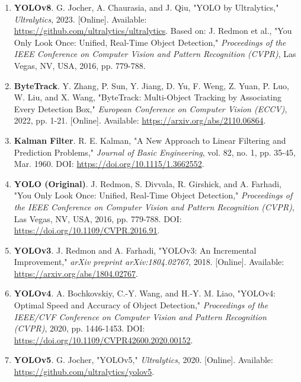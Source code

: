 \begin{enumerate}[resume]
    \item \textbf{YOLOv8}. G. Jocher, A. Chaurasia, and J. Qiu, "YOLO by Ultralytics," 
    \textit{Ultralytics}, 2023. [Online]. Available: \url{https://github.com/ultralytics/ultralytics}. 
    Based on: J. Redmon et al., "You Only Look Once: Unified, Real-Time Object Detection," 
    \textit{Proceedings of the IEEE Conference on Computer Vision and Pattern Recognition (CVPR)}, 
    Las Vegas, NV, USA, 2016, pp. 779-788.
    
    \item \textbf{ByteTrack}. Y. Zhang, P. Sun, Y. Jiang, D. Yu, F. Weng, Z. Yuan, 
    P. Luo, W. Liu, and X. Wang, "ByteTrack: Multi-Object Tracking by Associating Every Detection Box," 
    \textit{European Conference on Computer Vision (ECCV)}, 2022, pp. 1-21. 
    [Online]. Available: \url{https://arxiv.org/abs/2110.06864}.
    
    \item \textbf{Kalman Filter}. R. E. Kalman, "A New Approach to Linear Filtering and Prediction Problems," 
    \textit{Journal of Basic Engineering}, vol. 82, no. 1, pp. 35-45, Mar. 1960. 
    DOI: \url{https://doi.org/10.1115/1.3662552}.
    
    \item \textbf{YOLO (Original)}. J. Redmon, S. Divvala, R. Girshick, and A. Farhadi, 
    "You Only Look Once: Unified, Real-Time Object Detection," 
    \textit{Proceedings of the IEEE Conference on Computer Vision and Pattern Recognition (CVPR)}, 
    Las Vegas, NV, USA, 2016, pp. 779-788. DOI: \url{https://doi.org/10.1109/CVPR.2016.91}.
    
    \item \textbf{YOLOv3}. J. Redmon and A. Farhadi, "YOLOv3: An Incremental Improvement," 
    \textit{arXiv preprint arXiv:1804.02767}, 2018. [Online]. Available: 
    \url{https://arxiv.org/abs/1804.02767}.
    
    \item \textbf{YOLOv4}. A. Bochkovskiy, C.-Y. Wang, and H.-Y. M. Liao, "YOLOv4: Optimal Speed and Accuracy of Object Detection," 
    \textit{Proceedings of the IEEE/CVF Conference on Computer Vision and Pattern Recognition (CVPR)}, 
    2020, pp. 1446-1453. DOI: \url{https://doi.org/10.1109/CVPR42600.2020.00152}.
    
    \item \textbf{YOLOv5}. G. Jocher, "YOLOv5," \textit{Ultralytics}, 2020. [Online]. 
    Available: \url{https://github.com/ultralytics/yolov5}.
    

\end{enumerate}
